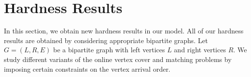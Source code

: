 \documentclass{article}
\begin{document}
%
%

\section{Hardness Results}

In this section, we obtain new hardness results in our model. All of our hardness results are obtained by considering appropriate bipartite graphs.
Let $G=(L,R,E)$ be a bipartite graph with left vertices $L$ and right vertices $R$. We study different variants of the online vertex cover and matching problems by imposing certain constraints on the vertex arrival order.
\end{document}
